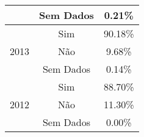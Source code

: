 \documentclass[14pt]{extarticle}
\begin{document}
\begin{table}[htbp]
\begin{adjustbox}{max width=\linewidth}
\begin{tabular}{ccc}
         & Sem Dados & 0.21\% \\
    \midrule
    \multirow{3}[2]{*}{2013} & Sim  & 90.18\% \\
         & Não  & 9.68\% \\
         & Sem Dados & 0.14\% \\
    \midrule
    \multirow{3}[2]{*}{2012} & Sim  & 88.70\% \\
         & Não  & 11.30\% \\
         & Sem Dados & 0.00\% \\
    \bottomrule
    \end{tabular}%
\end{adjustbox}
  \label{tab:saber_ler_escrever1}%
\end{table}%


\end{document}

